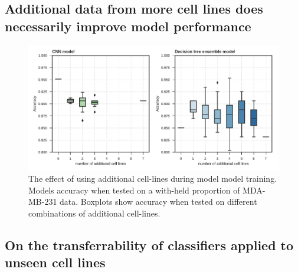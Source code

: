 \documentclass[a4paper,11pt,twoside,openright]{scrbook}
\begin{document}
\subsection{Additional data from more cell lines does necessarily improve model performance}

\begin{figure}
    \includegraphics[width=1.0\textwidth]{ch2CumulativeTraining}
    \captionsetup{width=0.8\textwidth}
    \caption[The effect of using additional cell-lines during model training]{
        The effect of using additional cell-lines during model model training.
        Models accuracy when tested on a with-held proportion of MDA-MB-231 data.
        Boxplots show accuracy when tested on different combinations of additional cell-lines.
    }
    \label{figure:cumulative_training}
\end{figure}



\subsection{On the transferrability of classifiers applied to unseen cell lines}
\end{document}
